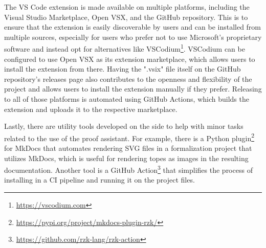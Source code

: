 The VS Code extension is made available on multiple platforms, including the Visual Studio Marketplace, Open VSX, and the GitHub repository.
This is to ensure that the extension is easily discoverable by users and can be installed from multiple sources, especially for users
who prefer not to use Microsoft's proprietary software and instead opt for alternatives like VSCodium\footnote{\url{https://vscodium.com}}.
VSCodium can be configured to use Open VSX as its extension marketplace, which allows users to install the extension from there.
Having the ".vsix" file itself on the GitHub repository's releases page also contributes to the openness and flexibility of the project
and allows users to install the extension manually if they prefer.
Releasing to all of those platforms is automated using GitHub Actions, which builds the extension and uploads it to the respective marketplace.

Lastly, there are utility tools developed on the side to help with minor tasks related to the use of the proof assistant.
For example, there is a Python plugin\footnote{\url{https://pypi.org/project/mkdocs-plugin-rzk/}} for MkDocs that automates rendering
SVG files in a formalization project that utilizes MkDocs, which is useful for rendering topes as images in the resulting documentation.
Another tool is a GitHub Action\footnote{\url{https://github.com/rzk-lang/rzk-action}} that simplifies the process
of installing \Rzk{} in a CI pipeline and running it on the project files.
